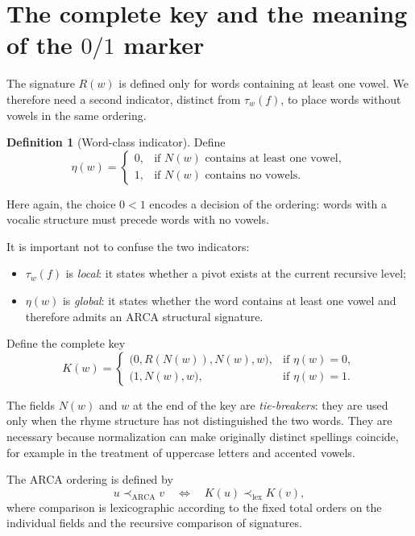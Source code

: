 \documentclass[11pt,a4paper]{article}
\theoremstyle{definition}
\newtheorem{definition}[theorem]{Definition}
\theoremstyle{remark}
\newcommand{\ARCA}{\mathrm{ARCA}}
\newcommand{\precA}{\prec_{\ARCA}}
\newcommand{\lexord}{\prec_{\mathrm{lex}}}
\newcommand{\Nrm}{N}
\newcommand{\Sig}{R}
\newcommand{\Tag}{\tau_w}
\newcommand{\Class}{\eta}
\begin{document}
\section{The complete key and the meaning of the $0/1$ marker}

The signature $\Sig(w)$ is defined only for words containing at least one vowel. We therefore need a second indicator, distinct from $\Tag(f)$, to place words without vowels in the same ordering.

\begin{definition}[Word-class indicator]
Define
\[
  \Class(w)=
  \begin{cases}
    0, & \text{if }\Nrm(w)\text{ contains at least one vowel},\\
    1, & \text{if }\Nrm(w)\text{ contains no vowels}.
  \end{cases}
\]
\end{definition}

Here again, the choice $0<1$ encodes a decision of the ordering: words with a vocalic structure must precede words with no vowels.

It is important not to confuse the two indicators:
\begin{itemize}
  \item $\Tag(f)$ is \emph{local}: it states whether a pivot exists at the current recursive level;
  \item $\Class(w)$ is \emph{global}: it states whether the word contains at least one vowel and therefore admits an ARCA structural signature.
\end{itemize}

Define the complete key
\[
  K(w)=
  \begin{cases}
    \bigl(0,\Sig(\Nrm(w)),\Nrm(w),w\bigr),
      & \text{if }\Class(w)=0,\\[0.4em]
    \bigl(1,\Nrm(w),w\bigr),
      & \text{if }\Class(w)=1.
  \end{cases}
\]

The fields $\Nrm(w)$ and $w$ at the end of the key are \emph{tie-breakers}: they are used only when the rhyme structure has not distinguished the two words. They are necessary because normalization can make originally distinct spellings coincide, for example in the treatment of uppercase letters and accented vowels.

The ARCA ordering is defined by
\[
  u\precA v
  \quad\Longleftrightarrow\quad
  K(u)\lexord K(v),
\]
where comparison is lexicographic according to the fixed total orders on the individual fields and the recursive comparison of signatures.
\end{document}
